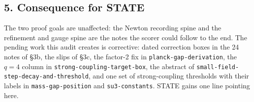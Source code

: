 \documentclass[11pt,a4paper]{article}
\begin{document}
\hypertarget{consequence-for-state}{%
\subsection{5. Consequence for STATE}\label{consequence-for-state}}

The two proof goals are unaffected: the Newton recording spine and the
refinement and gauge spine are the notes the scorer could follow to the
end. The pending work this audit creates is corrective: dated correction
boxes in the 24 notes of §3b, the slips of §3c, the factor-2 fix in
\texttt{planck-gap-derivation}, the \(q=4\) column in
\texttt{strong-coupling-target-box}, the abstract of
\texttt{small-field-step-decay-and-threshold}, and one set of
strong-coupling thresholds with their labels in
\texttt{mass-gap-position} and \texttt{su3-constants}. STATE gains one
line pointing here.
\end{document}
